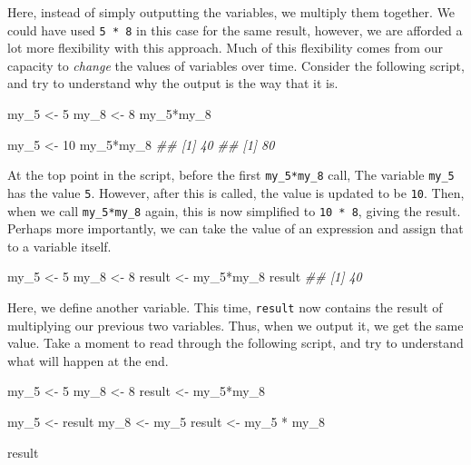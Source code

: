 \documentclass[
  letterpaper,
  DIV=11,
  numbers=noendperiod]{scrreprt}
\newenvironment{Shaded}{\begin{snugshade}}{\end{snugshade}}
\newcommand{\DecValTok}[1]{\textcolor[rgb]{0.68,0.00,0.00}{#1}}
\newcommand{\DocumentationTok}[1]{\textcolor[rgb]{0.37,0.37,0.37}{\textit{#1}}}
\newcommand{\NormalTok}[1]{\textcolor[rgb]{0.00,0.23,0.31}{#1}}
\newcommand{\OtherTok}[1]{\textcolor[rgb]{0.00,0.23,0.31}{#1}}
\newcommand{\SpecialCharTok}[1]{\textcolor[rgb]{0.37,0.37,0.37}{#1}}
\theoremstyle{definition}
\theoremstyle{definition}
\theoremstyle{definition}
\theoremstyle{remark}
\begin{document}
Here, instead of simply outputting the variables, we multiply them
together. We could have used \texttt{5\ *\ 8} in this case for the same
result, however, we are afforded a lot more flexibility with this
approach. Much of this flexibility comes from our capacity to
\emph{change} the values of variables over time. Consider the following
script, and try to understand why the output is the way that it is.

\begin{Shaded}
\begin{Highlighting}[]
\NormalTok{my\_5 }\OtherTok{\textless{}{-}} \DecValTok{5}
\NormalTok{my\_8 }\OtherTok{\textless{}{-}} \DecValTok{8}
\NormalTok{my\_5}\SpecialCharTok{*}\NormalTok{my\_8}

\NormalTok{my\_5 }\OtherTok{\textless{}{-}} \DecValTok{10}
\NormalTok{my\_5}\SpecialCharTok{*}\NormalTok{my\_8}
\DocumentationTok{\#\# [1] 40}
\DocumentationTok{\#\# [1] 80}
\end{Highlighting}
\end{Shaded}

At the top point in the script, before the first \texttt{my\_5*my\_8}
call, The variable \texttt{my\_5} has the value \texttt{5}. However,
after this is called, the value is updated to be \texttt{10}. Then, when
we call \texttt{my\_5*my\_8} again, this is now simplified to
\texttt{10\ *\ 8}, giving the result. Perhaps more importantly, we can
take the value of an expression and assign that to a variable itself.

\begin{Shaded}
\begin{Highlighting}[]
\NormalTok{my\_5 }\OtherTok{\textless{}{-}} \DecValTok{5}
\NormalTok{my\_8 }\OtherTok{\textless{}{-}} \DecValTok{8}
\NormalTok{result }\OtherTok{\textless{}{-}}\NormalTok{ my\_5}\SpecialCharTok{*}\NormalTok{my\_8}
\NormalTok{result }
\DocumentationTok{\#\# [1] 40}
\end{Highlighting}
\end{Shaded}

Here, we define another variable. This time, \texttt{result} now
contains the result of multiplying our previous two variables. Thus,
when we output it, we get the same value. Take a moment to read through
the following script, and try to understand what will happen at the end.

\begin{Shaded}
\begin{Highlighting}[]
\NormalTok{my\_5 }\OtherTok{\textless{}{-}} \DecValTok{5}
\NormalTok{my\_8 }\OtherTok{\textless{}{-}} \DecValTok{8}
\NormalTok{result }\OtherTok{\textless{}{-}}\NormalTok{ my\_5}\SpecialCharTok{*}\NormalTok{my\_8}

\NormalTok{my\_5 }\OtherTok{\textless{}{-}}\NormalTok{ result}
\NormalTok{my\_8 }\OtherTok{\textless{}{-}}\NormalTok{ my\_5}
\NormalTok{result }\OtherTok{\textless{}{-}}\NormalTok{ my\_5 }\SpecialCharTok{*}\NormalTok{ my\_8}

\NormalTok{result }
\end{Highlighting}
\end{Shaded}
\end{document}
